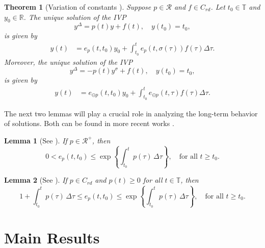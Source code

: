 \documentclass[pdflatex,sn-mathphys-num]{sn-jnl}
\newtheorem{theorem}{Theorem}
\newtheorem{lemma}{Lemma}
\theoremstyle{remark}
\begin{document}
\begin{theorem}[Variation of constants \cite{advanced:book:ts}]
\label{thm:5}
Suppose $p \in \mathcal{R}$ and $f \in C_{rd}$. Let $t_0 \in \mathbb{T}$ 
and $y_0 \in\mathbb{R}$. The unique solution of the IVP 
$$y^\Delta = p(t)y + f(t),\quad y(t_0) = t_0,$$
is given by
\begin{equation*}
\begin{aligned}
y(t) &= e_p(t,t_0)y_0 + \int_{t_0}^{t} e_p(t, \sigma(\tau))f(\tau)\Delta\tau.
\end{aligned}
\end{equation*}
Moreover, the unique solution of the IVP
$$y^\Delta = -p(t)y^\sigma + f(t),\quad y(t_0) = t_0,$$
is given by 
\begin{equation*}
\begin{aligned}
y(t) &= e_{\ominus p}(t,t_0)y_0 + \int_{t_0}^{t} 
e_{\ominus p}(t, \tau)f(\tau)\Delta\tau.
\end{aligned}
\end{equation*}
\end{theorem}

The next two lemmas will play a crucial role in analyzing the long-term 
behavior of solutions. Both can be found in more recent works \cite{osc, prop}.

\begin{lemma}[See \cite{prop}]
\label{lemma:1}
If $p \in \mathcal{R}^+$, then
$$
0 < e_p(t,t_0) \leq \exp\left\{\int_{t_0}^{t} p(\tau) \,\Delta\tau\right\},
\quad \text{for all}\,\, t\geq t_0. 
$$
\end{lemma}

\begin{lemma}[See \cite{osc}]
\label{lemma:2}
If $p \in C_{rd}$ and $p(t) \geq 0$ for all $t \in \mathbb{T}$, then
$$
1 + \int_{t_0}^t p(\tau) \,\Delta\tau 
\leq e_p(t,t_0) \leq \exp\left\{\int_{t_0}^t p(\tau)\, \Delta\tau\right\},
\quad \text{for all}\,\, t\geq t_0. 
$$ 
\end{lemma}


\section{Main Results}
\label{sec3}
\end{document}
